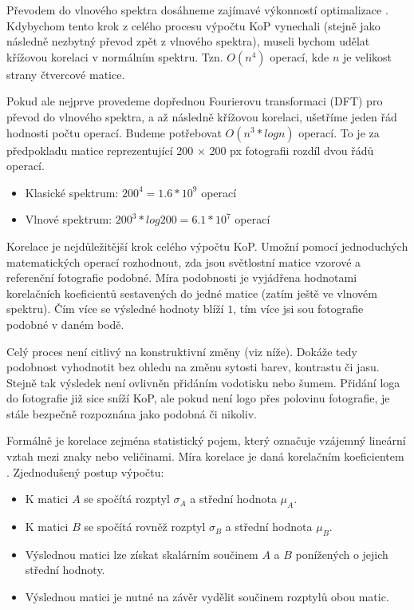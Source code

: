 Převodem do vlnového spektra dosáhneme zajímavé výkonností optimalizace \cite{FFT}. Kdybychom tento krok z celého procesu výpočtu KoP vynechali (stejně jako následně nezbytný převod zpět z vlnového spektra), museli bychom udělat křížovou korelaci v normálním spektru. Tzn. $ O(n^4) $ operací, kde $ n $ je velikost strany čtvercové matice.

Pokud ale nejprve provedeme dopřednou Fourierovu transformaci (DFT) pro převod do vlnového spektra, a až následně křížovou korelaci, ušetříme jeden řád hodnosti počtu operací. Budeme potřebovat $ O(n^3 * logn) $ operací. To je za předpokladu matice reprezentující 200 × 200 px fotografii rozdíl dvou řádů operací.
\begin{itemize}
	\setlength{\parskip}{0pt}
	\setlength{\itemsep}{0pt}
	\item{Klasické spektrum: $ 200^4 = 1.6 * 10^9 $ operací}
	\item{Vlnové spektrum: $ 200^3 * log 200 = 6.1 * 10^7 $ operací}
\end{itemize}

Korelace je nejdůležitější krok celého výpočtu KoP. Umožní pomocí jednoduchých matematických operací rozhodnout, zda jsou světlostní matice vzorové a referenční fotografie podobné. Míra podobnosti je vyjádřena hodnotami korelačních koeficientů sestavených do jedné matice (zatím ještě ve vlnovém spektru). Čím více se výsledné hodnoty blíží $ 1 $, tím více jsi sou fotografie podobné v daném bodě.

Celý proces není citlivý na konstruktivní změny (viz níže). Dokáže tedy podobnost vyhodnotit bez ohledu na změnu sytosti barev, kontrastu či jasu. Stejně tak výsledek není ovlivněn přidáním vodotisku nebo šumem. Přidání loga do fotografie již sice sníží KoP, ale pokud není logo přes polovinu fotografie, je stále bezpečně rozpoznána jako podobná či nikoliv.

Formálně je korelace zejména statistický pojem, který označuje vzájemný lineární vztah mezi znaky nebo veličinami. Míra korelace je daná korelačním koeficientem \cite{correlation}. Zjednodušený postup výpočtu:
\begin{itemize}
	\setlength{\parskip}{0pt}
	\setlength{\itemsep}{0pt}
	\item{K matici $ A $ se spočítá rozptyl $ \sigma_{A} $ a střední hodnota $ \mu_{A} $.}
	\item{K matici $ B $ se spočítá rovněž rozptyl $ \sigma_{B} $ a střední hodnota $ \mu_{B} $.}
	\item{Výslednou matici lze získat skalárním součinem $ A $ a $ B $ ponížených o jejich střední hodnoty.}
	\item{Výslednou matici je nutné na závěr vydělit součinem rozptylů obou matic.}
\end{itemize}

